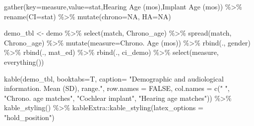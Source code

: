 \documentclass[
]{article}
\newenvironment{Shaded}{\begin{snugshade}}{\end{snugshade}}
\newcommand{\AttributeTok}[1]{\textcolor[rgb]{0.77,0.63,0.00}{#1}}
\newcommand{\ConstantTok}[1]{\textcolor[rgb]{0.00,0.00,0.00}{#1}}
\newcommand{\FunctionTok}[1]{\textcolor[rgb]{0.00,0.00,0.00}{#1}}
\newcommand{\NormalTok}[1]{#1}
\newcommand{\OtherTok}[1]{\textcolor[rgb]{0.56,0.35,0.01}{#1}}
\newcommand{\SpecialCharTok}[1]{\textcolor[rgb]{0.00,0.00,0.00}{#1}}
\newcommand{\StringTok}[1]{\textcolor[rgb]{0.31,0.60,0.02}{#1}}
\begin{document}
\begin{Shaded}
\begin{Highlighting}[]
  \FunctionTok{gather}\NormalTok{(}\AttributeTok{key=}\StringTok{\textquotesingle{}measure\textquotesingle{}}\NormalTok{,}\AttributeTok{value=}\StringTok{\textquotesingle{}stat\textquotesingle{}}\NormalTok{,}\StringTok{\textasciigrave{}}\AttributeTok{Hearing Age (mos)}\StringTok{\textasciigrave{}}\NormalTok{,}\StringTok{\textasciigrave{}}\AttributeTok{Implant Age (mos)}\StringTok{\textasciigrave{}}\NormalTok{) }\SpecialCharTok{\%\textgreater{}\%}
  \FunctionTok{rename}\NormalTok{(}\AttributeTok{CI=}\NormalTok{stat) }\SpecialCharTok{\%\textgreater{}\%}
  \FunctionTok{mutate}\NormalTok{(}\AttributeTok{chrono=}\StringTok{\textquotesingle{}NA\textquotesingle{}}\NormalTok{,}
         \AttributeTok{HA=}\StringTok{\textquotesingle{}NA\textquotesingle{}}\NormalTok{)}
  
  
\NormalTok{demo\_tbl }\OtherTok{\textless{}{-}}\NormalTok{ demo }\SpecialCharTok{\%\textgreater{}\%}
  \FunctionTok{select}\NormalTok{(match, Chrono\_age) }\SpecialCharTok{\%\textgreater{}\%}
  \FunctionTok{spread}\NormalTok{(match, Chrono\_age) }\SpecialCharTok{\%\textgreater{}\%}
  \FunctionTok{mutate}\NormalTok{(}\AttributeTok{measure=}\StringTok{\textquotesingle{}Chrono. Age (mos)\textquotesingle{}}\NormalTok{) }\SpecialCharTok{\%\textgreater{}\%}
  \FunctionTok{rbind}\NormalTok{(., gender) }\SpecialCharTok{\%\textgreater{}\%}
  \FunctionTok{rbind}\NormalTok{(., mat\_ed) }\SpecialCharTok{\%\textgreater{}\%}
  \FunctionTok{rbind}\NormalTok{(., ci\_demo) }\SpecialCharTok{\%\textgreater{}\%}
  \FunctionTok{select}\NormalTok{(measure, }\FunctionTok{everything}\NormalTok{())}

\FunctionTok{kable}\NormalTok{(demo\_tbl, }\AttributeTok{booktabs=}\NormalTok{T, }
              \AttributeTok{caption=} \StringTok{"Demographic and audiological information. Mean (SD), range."}\NormalTok{,}
             \AttributeTok{row.names =} \ConstantTok{FALSE}\NormalTok{,}
       \AttributeTok{col.names =} \FunctionTok{c}\NormalTok{(}\StringTok{" "}\NormalTok{,}
                    \StringTok{"Chrono. age matches"}\NormalTok{,}
                    \StringTok{"Cochlear implant"}\NormalTok{,}
                    \StringTok{"Hearing age matches"}\NormalTok{)) }\SpecialCharTok{\%\textgreater{}\%} 
  \FunctionTok{kable\_styling}\NormalTok{() }\SpecialCharTok{\%\textgreater{}\%}
\NormalTok{  kableExtra}\SpecialCharTok{::}\FunctionTok{kable\_styling}\NormalTok{(}\AttributeTok{latex\_options =} \StringTok{"hold\_position"}\NormalTok{)}
\end{Highlighting}
\end{Shaded}
\end{document}

